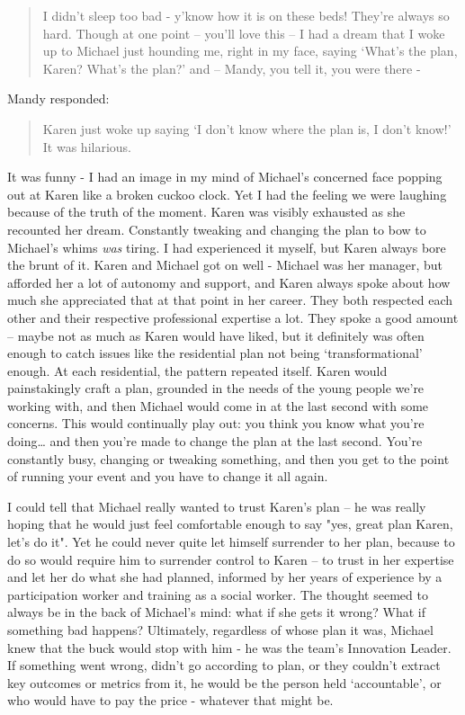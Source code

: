 \begin{quote}
I didn’t sleep too bad - y’know how it is on these beds! They’re always so hard. Though at one point – you’ll love this – I had a dream that I woke up  to Michael just hounding me, right in my face, saying ‘What’s the plan, Karen? What’s the plan?’ and – Mandy, you tell it, you were there -
\end{quote}
Mandy responded:
\begin{quote}
Karen just woke up saying ‘I don’t know where the plan is, I don’t know!’ It was hilarious.
\end{quote}
It was funny - I had an image in my mind of Michael’s concerned face popping out at Karen like a broken cuckoo clock. Yet I had the feeling we were laughing because of the truth of the moment. Karen was visibly exhausted as she recounted her dream. Constantly tweaking and changing the plan to bow to Michael’s whims \emph{was} tiring. I had experienced it myself, but Karen always bore the brunt of it. Karen and Michael got on well - Michael was her manager, but afforded her a lot of autonomy and support, and Karen always spoke about how much she appreciated that at that point in her career. They both respected each other and their respective professional expertise a lot. They spoke a good amount – maybe not as much as Karen would have liked, but it definitely was often enough to catch issues like the residential plan not being `transformational' enough. At each residential, the pattern repeated itself. Karen would painstakingly craft a plan, grounded in the needs of the young people we’re working with, and then Michael would come in at the last second with some concerns. This would continually play out: you think you know what you’re doing… and then you’re made to change the plan at the last second. You’re constantly busy, changing or tweaking something, and then you get to the point of running your event and you have to change it all again. 

I could tell that Michael really wanted to trust Karen’s plan – he was really hoping that he would just feel comfortable enough to say "yes, great plan Karen, let’s do it". Yet he could never quite let himself surrender to her plan, because to do so would require him to surrender control to Karen – to trust in her expertise and let her do what she had planned, informed by her years of experience by a participation worker and training as a social worker. The thought seemed to always be in the back of Michael’s mind: what if she gets it wrong? What if something bad happens? Ultimately, regardless of whose plan it was, Michael knew that the buck would stop with him - he was the team's Innovation Leader.  If something went wrong, didn’t go according to plan, or they couldn’t extract key outcomes or metrics from it, he would be the person held `accountable', or who would have to pay the price - whatever that might be. 

